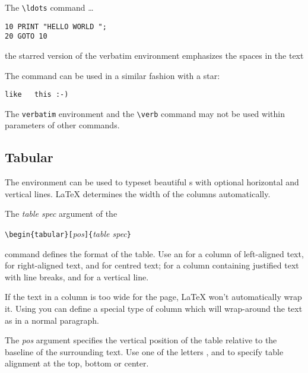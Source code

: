 \begin{example}
The \verb|\ldots| command \ldots

\begin{verbatim}
10 PRINT "HELLO WORLD ";
20 GOTO 10
\end{verbatim}
\end{example}

\begin{example}
\begin{verbatim*}
the starred version of
the      verbatim   
environment emphasizes
the spaces   in the text
\end{verbatim*}
\end{example}

The  command can be used in a similar fashion with a star:

\begin{example}
\verb*|like   this :-) |
\end{example}

The \texttt{verbatim} environment and the \verb|\verb| command may not be used
within parameters of other commands.

 
\subsection{Tabular}

\newcommand{\mfr}[1]{\framebox{\rule{0pt}{0.7em}\texttt{#1}}}

The  environment can be used to typeset beautiful
s with optional horizontal and vertical lines. \LaTeX{}
determines the width of the columns automatically.

The \emph{table spec} argument of the 
\begin{lscommand}
\verb|\begin{tabular}[|\emph{pos}\verb|]{|\emph{table spec}\verb|}|
\end{lscommand} 
\noindent command defines the format of the table. Use an \mfr{l} for a column of
left-aligned text, \mfr{r} for right-aligned text, and \mfr{c} for
centred text; \mfr{p\{\emph{width}\}} for a column containing justified
text with line breaks, and \mfr{|} for a vertical line.

If the text in a column is too wide for the page, \LaTeX{} won't
automatically wrap it. Using \mfr{p\{\emph{width}\}} you can define
a special type of column which will wrap-around the text as in a normal paragraph.

The \emph{pos} argument specifies the vertical position of the table
relative to the baseline of the surrounding text.  Use one of the
letters \mfr{t}, \mfr{b} and \mfr{c} to specify table
alignment at the top, bottom or center.
 

